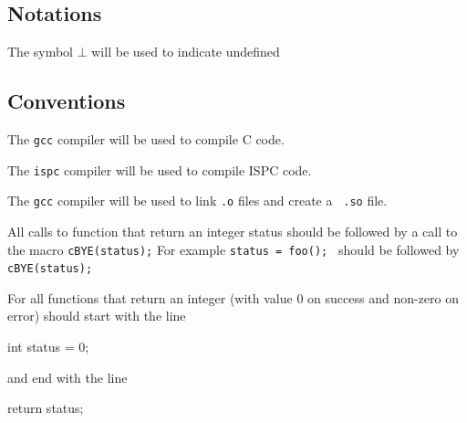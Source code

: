 \subsection{Notations}

\begin{notation}
The symbol \(\bot\) will be used to indicate undefined
\end{notation}

\subsection{Conventions}

\begin{convention}
  The {\tt gcc} compiler will be used to compile C code.
\end{convention}

\begin{convention}
  The {\tt ispc} compiler will be used to compile ISPC code.
\end{convention}

\begin{convention}
  The {\tt gcc} compiler will be used to link {\tt .o} files and create a {\tt
  .so} file.
\end{convention}

\begin{convention}
All calls to function that return an integer status should be followed by a
  call to the macro \verb+cBYE(status);+ For example
  {\tt status = foo(); } should be followed by {\tt cBYE(status); }
\end{convention}

\begin{convention}
  For all functions that return an integer 
  (with value 0 on success and non-zero on error) should start with the line
  \begin{center}
    int status = 0;
  \end{center}
  and end with the line
  \begin{center}
    return status; 
  \end{center}
\end{convention}
